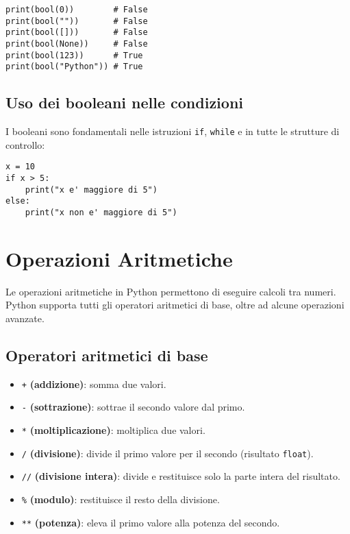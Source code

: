\documentclass[a4paper,12pt]{article}
\begin{document}
\begin{lstlisting}
print(bool(0))        # False
print(bool(""))       # False
print(bool([]))       # False
print(bool(None))     # False
print(bool(123))      # True
print(bool("Python")) # True
\end{lstlisting}

\subsection*{Uso dei booleani nelle condizioni}
I booleani sono fondamentali nelle istruzioni \texttt{if}, \texttt{while} e in tutte le strutture di controllo:
\begin{lstlisting}
x = 10
if x > 5:
    print("x e' maggiore di 5")
else:
    print("x non e' maggiore di 5")
\end{lstlisting}

\begin{center}
\end{center}

\section{Operazioni Aritmetiche}
Le operazioni aritmetiche in Python permettono di eseguire calcoli tra numeri. Python supporta tutti gli operatori aritmetici di base, oltre ad alcune operazioni avanzate.

\subsection*{Operatori aritmetici di base}
\begin{itemize}
    \item \texttt{+} \textbf{(addizione)}: somma due valori.
    \item \texttt{-} \textbf{(sottrazione)}: sottrae il secondo valore dal primo.
    \item \texttt{*} \textbf{(moltiplicazione)}: moltiplica due valori.
    \item \texttt{/} \textbf{(divisione)}: divide il primo valore per il secondo (risultato \texttt{float}).
    \item \texttt{//} \textbf{(divisione intera)}: divide e restituisce solo la parte intera del risultato.
    \item \texttt{\%} \textbf{(modulo)}: restituisce il resto della divisione.
    \item \texttt{**} \textbf{(potenza)}: eleva il primo valore alla potenza del secondo.
\end{itemize}
\end{document}
